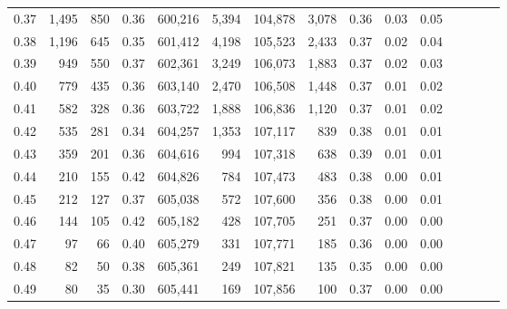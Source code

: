 \begin{tabular}{rrrcrrrrrrrrrrr}
0.37 &   1,495 &    850 &                                       0.36 &  600,216 &    5,394 &  104,878 &    3,078 &  0.36 &  0.03 &                         0.05 \\
0.38 &   1,196 &    645 &                                       0.35 &  601,412 &    4,198 &  105,523 &    2,433 &  0.37 &  0.02 &                         0.04 \\
0.39 &     949 &    550 &                                       0.37 &  602,361 &    3,249 &  106,073 &    1,883 &  0.37 &  0.02 &                         0.03 \\
0.40 &     779 &    435 &                                       0.36 &  603,140 &    2,470 &  106,508 &    1,448 &  0.37 &  0.01 &                         0.02 \\
0.41 &     582 &    328 &                                       0.36 &  603,722 &    1,888 &  106,836 &    1,120 &  0.37 &  0.01 &                         0.02 \\
0.42 &     535 &    281 &                                       0.34 &  604,257 &    1,353 &  107,117 &      839 &  0.38 &  0.01 &                         0.01 \\
0.43 &     359 &    201 &                                       0.36 &  604,616 &      994 &  107,318 &      638 &  0.39 &  0.01 &                         0.01 \\
0.44 &     210 &    155 &                                       0.42 &  604,826 &      784 &  107,473 &      483 &  0.38 &  0.00 &                         0.01 \\
0.45 &     212 &    127 &                                       0.37 &  605,038 &      572 &  107,600 &      356 &  0.38 &  0.00 &                         0.01 \\
0.46 &     144 &    105 &                                       0.42 &  605,182 &      428 &  107,705 &      251 &  0.37 &  0.00 &                         0.00 \\
0.47 &      97 &     66 &                                       0.40 &  605,279 &      331 &  107,771 &      185 &  0.36 &  0.00 &                         0.00 \\
0.48 &      82 &     50 &                                       0.38 &  605,361 &      249 &  107,821 &      135 &  0.35 &  0.00 &                         0.00 \\
0.49 &      80 &     35 &                                       0.30 &  605,441 &      169 &  107,856 &      100 &  0.37 &  0.00 &                         0.00 \\

\end{tabular}

